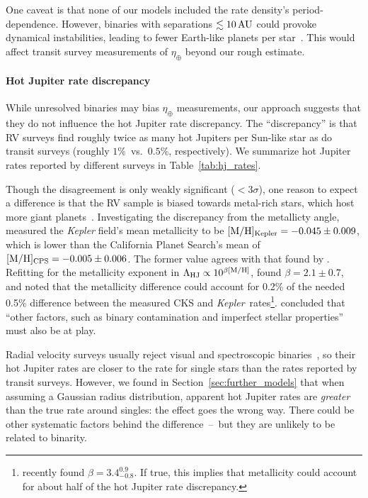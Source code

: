 \documentclass[12pt,modern]{aastex61}
\begin{document}
One caveat is that none of our models included the rate density's
period-dependence. However, binaries with separations $\lesssim
10\,{\rm AU}$ could provoke dynamical instabilities, leading to fewer
Earth-like planets per
star~\citep[\textit{e.g.},][]{holman_long-term_1999,wang_influence_2014,
kraus_impact_2016}.  This would affect transit survey measurements of
$\eta_\oplus$ beyond our rough estimate.

\paragraph{Hot Jupiter rate discrepancy}
While unresolved binaries may bias $\eta_\oplus$ measurements, our
approach suggests that they do not influence the hot Jupiter rate
discrepancy.  The ``discrepancy'' is that RV surveys find roughly
twice as many hot Jupiters per Sun-like star as do transit surveys
(roughly $1\%$~vs.~$0.5\%$, respectively).  We summarize hot
Jupiter rates reported by different surveys in
Table~\ref{tab:hj_rates}.

Though the disagreement is only weakly significant ($<3\sigma$), one
reason to expect a difference is that the RV sample is biased towards
metal-rich stars, which host more giant
planets~\citep{santos_spectroscopic_2004,fischer_planet-metallicity_2005,gould_frequency_2006}.
Investigating the discrepancy from the metallicty
angle,~\citet{guo_metallicity_2017} measured the {\it Kepler} field's
mean metallicity to be $[{\rm M/H}]_{\rm Kepler}= -0.045\pm0.009$,
which is lower than the California Planet Search's mean of $[{\rm
M/H}]_{\rm CPS}= -0.005\pm0.006$.  The former value agrees with that
found by \citet{dong_metallicities_2014}.  Refitting for the
metallicity exponent in $\Lambda_{\rm HJ} \propto 10^{\beta [{\rm
M/H}] }$, \citeauthor{guo_metallicity_2017}\! found $\beta = 2.1\pm
0.7$, and noted that the metallicity difference could account for
0.2\% of the needed 0.5\% difference between the measured CKS
and {\it Kepler}\ rates\footnote{ \citet{petigura_CKS_2017} recently
found $\beta = 3.4^{0.9}_{-0.8}$.  If true, this implies that
metallicity could account for about half of the hot Jupiter rate
discrepancy.  }.  \citeauthor{guo_metallicity_2017}\!  concluded
that ``other factors, such as binary contamination and imperfect
stellar properties'' must also be at play.

Radial velocity surveys usually reject visual and spectroscopic
binaries~\citep{wright_frequency_2012}, so their hot Jupiter rates are
closer to the rate for single stars than the rates reported by transit
surveys.  However, we found in Section~\ref{sec:further_models} that
when assuming a Gaussian radius distribution, apparent hot Jupiter
rates are {\it greater} than the true rate around singles: the effect
goes the wrong way.  There could be other systematic factors behind
the difference~--~but they are unlikely to be related to binarity.
\end{document}
